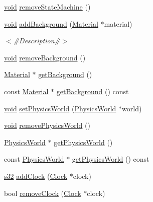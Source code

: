 \begin{DoxyCompactItemize}
\item 
\mbox{\hyperlink{_thread_8h_af1e856da2e658414cb2456cb6f7ebc66}{void}} \mbox{\hyperlink{classnjli_1_1_scene_ab67517186a935dae9dca439f31c5154a}{remove\+State\+Machine}} ()
\item 
\mbox{\hyperlink{_thread_8h_af1e856da2e658414cb2456cb6f7ebc66}{void}} \mbox{\hyperlink{classnjli_1_1_scene_a1df198e68ada8de3eb23caa2eba04f5b}{add\+Background}} (\mbox{\hyperlink{classnjli_1_1_material}{Material}} $\ast$material)
\begin{DoxyCompactList}\small\item\em $<$\#\+Description\#$>$ \end{DoxyCompactList}\item 
\mbox{\hyperlink{_thread_8h_af1e856da2e658414cb2456cb6f7ebc66}{void}} \mbox{\hyperlink{classnjli_1_1_scene_a9186fa26416275bd05fdcc0357fa1745}{remove\+Background}} ()
\item 
\mbox{\hyperlink{classnjli_1_1_material}{Material}} $\ast$ \mbox{\hyperlink{classnjli_1_1_scene_ae2f72caffbca0a65f601ee99827e1c81}{get\+Background}} ()
\item 
const \mbox{\hyperlink{classnjli_1_1_material}{Material}} $\ast$ \mbox{\hyperlink{classnjli_1_1_scene_afbd5cc6d18028c8e948b4e4fb72bd891}{get\+Background}} () const
\item 
\mbox{\hyperlink{_thread_8h_af1e856da2e658414cb2456cb6f7ebc66}{void}} \mbox{\hyperlink{classnjli_1_1_scene_a81fba745ce70cb12f08c522627ff43fc}{set\+Physics\+World}} (\mbox{\hyperlink{classnjli_1_1_physics_world}{Physics\+World}} $\ast$world)
\item 
\mbox{\hyperlink{_thread_8h_af1e856da2e658414cb2456cb6f7ebc66}{void}} \mbox{\hyperlink{classnjli_1_1_scene_a967c76f1e30d1690cd5c7425f3dd2f29}{remove\+Physics\+World}} ()
\item 
\mbox{\hyperlink{classnjli_1_1_physics_world}{Physics\+World}} $\ast$ \mbox{\hyperlink{classnjli_1_1_scene_aacdcd2433fadc469c85c16ea50f9123d}{get\+Physics\+World}} ()
\item 
const \mbox{\hyperlink{classnjli_1_1_physics_world}{Physics\+World}} $\ast$ \mbox{\hyperlink{classnjli_1_1_scene_a9f348500b14218f8f4bc7f2bc3b16c63}{get\+Physics\+World}} () const
\item 
\mbox{\hyperlink{_util_8h_aa62c75d314a0d1f37f79c4b73b2292e2}{s32}} \mbox{\hyperlink{classnjli_1_1_scene_a666d9639161eaad751d3ff373325b33e}{add\+Clock}} (\mbox{\hyperlink{classnjli_1_1_clock}{Clock}} $\ast$clock)
\item 
bool \mbox{\hyperlink{classnjli_1_1_scene_a52ebc14871130c84d52d2db461cdd1fe}{remove\+Clock}} (\mbox{\hyperlink{classnjli_1_1_clock}{Clock}} $\ast$clock)

\end{DoxyCompactItemize}
